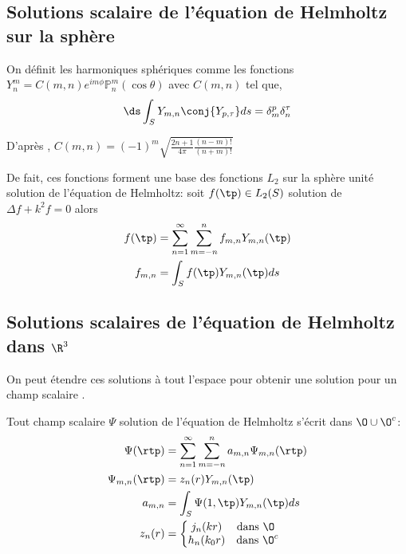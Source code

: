 \subsection{Solutions scalaire de l'équation de Helmholtz sur la sphère}

On définit les harmoniques sphériques comme les fonctions $Y_n^m = C(m,n) e^{im\phi}\mathbb{P}^m_n(\cos \theta) $ avec $C(m,n)$ tel que,
\[
 \ds\int_S Y_{m,n} \conj{Y_{p,\tau}} ds = \delta_m^p \delta_n^\tau
\]

D’après \cite[p.~24]{nedelec_acoustic_2001}, $ C(m,n) = (-1)^m\sqrt{\frac{2n+1}{4\pi}\frac{(n-m)!}{(n+m)!}}$

De fait, ces fonctions forment une base des fonctions $L_2$ sur la sphère unité solution de l'équation de Helmholtz: soit $f(\tp) \in L_2(S)$ solution de $ \Delta f + k^2 f = 0 $ alors
  \begin{align}
    f(\tp) &= \sum\limits_{n=1}^\infty\sum\limits_{m=-n}^n f_{m,n} Y_{m,n} (\tp)\\
    \notag f_{m,n} &= \int_S f(\tp) Y_{m,n}(\tp) ds
  \end{align}


\subsection{Solutions scalaires de l'équation de Helmholtz dans $\R^3$}
On peut étendre ces solutions à tout l'espace pour obtenir une solution pour un champ scalaire .

Tout champ scalaire $\Psi$ solution de l'équation de Helmholtz s'écrit dans $\O\cup\O^c$:
\begin{align} 
\label{eq:helm:sol_helmoltz_scal_somme}
\Psi(\rtp) &= \sum\limits_{n=1}^\infty\sum\limits_{m=-n}^n a_{m,n} \Psi_{m,n}(\rtp) \\
\Psi_{m,n}(\rtp) &= z_n(r) Y_{m,n}(\tp) \\
\notag a_{m,n} &= \int_S \Psi(1,\tp) Y_{m,n}(\tp) ds \\
z_n(r) &= \left\lbrace
  \begin{matrix}
  j_n(kr) &   \text{dans $\O~$} \\
  h_n(k_0r) & \text{dans $\O^c$} \\
  \end{matrix}\right.
\end{align}
